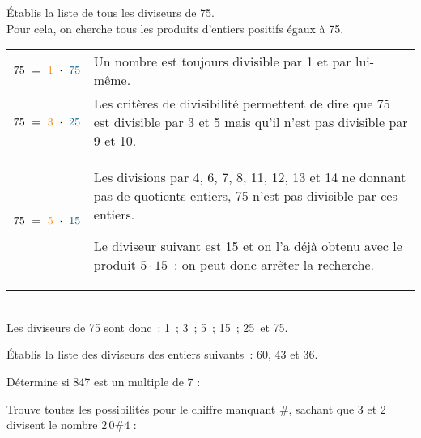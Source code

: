\begin{methode*1}
\begin{exemple*1}
Établis la liste de tous les diviseurs de 75.\\[1em]
Pour cela, on cherche tous les produits d'entiers positifs égaux à 75. \\[1em]
\begin{tabularx}{\textwidth}{c|X}
 $75 = \textcolor{J1}{1} \cdot \textcolor{A1}{75}$ &  Un nombre est toujours divisible par 1 et par lui-même. \\ 
 $75 = \textcolor{J1}{3} \cdot \textcolor{A1}{25}$ & Les critères de divisibilité permettent de dire que 75 est divisible par 3 et 5 mais qu'il n'est pas divisible par 9 et 10. \\
 $75 = \textcolor{J1}{5} \cdot \textcolor{A1}{15}$ & Les divisions par 4, 6, 7, 8, 11, 12, 13 et 14 ne donnant pas de quotients entiers, 75 n'est pas divisible par ces entiers.
 
Le diviseur suivant est 15 et on l'a déjà obtenu avec le produit $5 \cdot 15$ : on peut donc arrêter la recherche. \\
\end{tabularx} \\[1em]
Les diviseurs de 75 sont donc : \textcolor{J1}{1} ; \textcolor{J1}{3} ; \textcolor{J1}{5} ; \textcolor{A1}{15} ; \textcolor{A1}{25} et \textcolor{A1}{75}.
 \end{exemple*1}

\exercice 
Établis la liste des diviseurs des entiers suivants : 60, 43 et 36.

\dotfill

\dotfill

\dotfill

\exercice 
Détermine si 847 est un multiple de 7 :

\dotfill

\dotfill

\exercice  
Trouve toutes les possibilités pour le chiffre manquant $\#$, sachant que 3 et 2 divisent le nombre $2\,0\#4$ :

\dotfill

\dotfill
 

 \end{methode*1}
 
 

